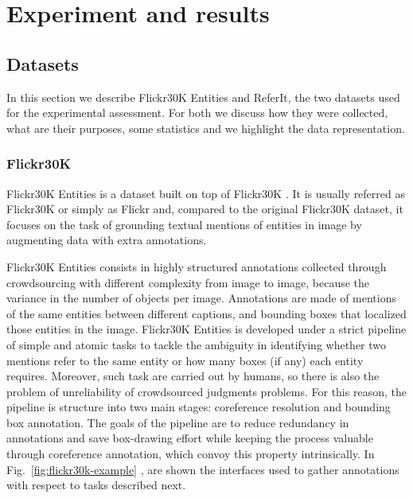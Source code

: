 
\chapter{Experiment and results}
\label{ch:experiments}

\section{Datasets}
\label{sec:datasets}

In this section we describe Flickr30K Entities and ReferIt, the two
datasets used for the experimental assessment. For both we discuss how
they were collected, what are their purposes, some statistics and we
highlight the data representation.

\subsection{Flickr30K}
\label{subsec:flickr30k}

Flickr30K Entities \cite{plummer2015flickr30k} is a dataset built on
top of Flickr30K \cite{young2014image}. It is usually referred as
Flickr30K or simply as Flickr and, compared to the original Flickr30K
dataset, it focuses on the task of grounding textual mentions of
entities in image by augmenting data with extra annotations.

Flickr30K Entities consists in highly structured annotations collected
through crowdsourcing with different complexity from image to image,
because the variance in the number of objects per image. Annotations
are made of mentions of the same entities between different captions,
and bounding boxes that localized those entities in the image.
Flickr30K Entities is developed under a strict pipeline of simple and
atomic tasks to tackle the ambiguity in identifying whether two
mentions refer to the same entity or how many boxes (if any) each
entity requires. Moreover, such task are carried out by humans, so
there is also the problem of unreliability of crowdsourced judgments
problems. For this reason, the pipeline is structure into two main
stages: coreference resolution and bounding box annotation. The goals
of the pipeline are to reduce redundancy in annotations and save
box-drawing effort while keeping the process valuable through
coreference annotation, which convoy this property intrinsically. In
Fig.~\ref{fig:flickr30k-example} \cite{plummer2015flickr30k}, are
shown the interfaces used to gather annotations with respect to tasks
described next.

